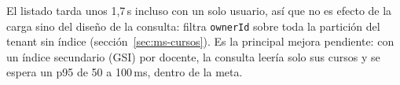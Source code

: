 El listado tarda unos 1{,}7\,s incluso con un solo usuario, así que no es efecto de la carga sino del
diseño de la consulta: filtra \texttt{ownerId} sobre toda la partición del tenant sin índice
(sección~\ref{sec:ms-cursos}). Es la principal mejora pendiente: con un índice secundario (GSI) por
docente, la consulta leería solo sus cursos y se espera un p95 de 50 a 100\,ms, dentro de la meta.

